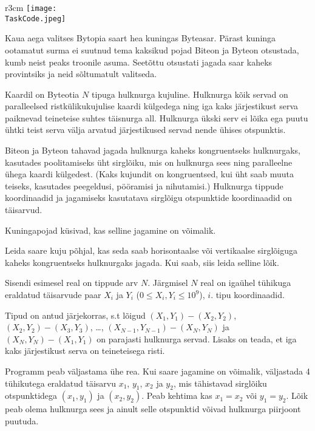 ﻿\documentclass{boi2014-et}
\renewcommand{\TaskCode}{demarcation}
\begin{document}
    \begin{wrapfigure}{r}{3cm}
        \vspace{-24pt}
        \texttt{[image: \\TaskCode.jpeg]}
    \end{wrapfigure}

    Kaua aega valitses Bytopia saart hea kuningas Byteasar.
    Pärast kuninga ootamatut surma ei suutnud tema kaksikud pojad
    Biteon ja Byteon otsustada, kumb neist peaks troonile asuma.
    Seetõttu otsustati jagada saar kaheks provintsiks ja neid
    sõltumatult valitseda.

    Kaardil on Byteotia $N$ tipuga hulknurga kujuline.
    Hulknurga kõik servad on paralleelsed ristkülikukujulise kaardi külgedega ning
    iga kaks järjestikust serva paiknevad teineteise suhtes täisnurga all.
    Hulknurga ükski serv ei lõika ega puutu ühtki teist serva välja arvatud
    järjestikused servad nende ühises otspunktis.

    Biteon ja Byteon tahavad jagada hulknurga kaheks kongruentseks hulknurgaks,
    kasutades poolitamiseks üht sirglõiku,
    mis on hulknurga sees ning paralleelne ühega kaardi külgedest.
    (Kaks kujundit on kongruentsed, kui üht saab muuta teiseks,
    kasutades peegeldusi, pööramisi ja nihutamisi.)
    Hulknurga tippude koordinaadid ja jagamiseks
    kasutatava sirglõigu otspunktide koordinaadid on täisarvud.

    Kuningapojad küsivad, kas selline jagamine on võimalik.

    \Task

    Leida saare kuju põhjal, kas seda saab horisontaalse või vertikaalse sirglõiguga
    kaheks kongruentseks hulknurgaks jagada.
    Kui saab, siis leida selline lõik.

    \Input

    Sisendi esimesel real on tippude arv $N$.
    Järgmisel $N$ real on igaühel tühikuga eraldatud täisarvude paar
    $X_i$ ja $Y_i$ ($0 \le X_i, Y_i \le 10^9$), $i$. tipu koordinaadid.

    Tipud on antud järjekorras, s.t lõigud $(X_1,Y_1) - (X_2,Y_2)$,
    $(X_2,Y_2) - (X_3,Y_3)$, \ldots, $(X_{N-1},Y_{N-1}) - (X_N,Y_N)$ ja
    $(X_N,Y_N) - (X_1,Y_1)$ on parajasti hulknurga servad.
    Lisaks on teada, et iga kaks järjestikust serva on teineteisega risti.

    \Output

    Programm peab väljastama ühe rea.
    Kui saare jagamine on võimalik, väljastada 4 tühikutega eraldatud täisarvu
    $x_1$, $y_1$, $x_2$ ja $y_2$, mis tähistavad sirglõiku otspunktidega
    $(x_1, y_1)$ ja $(x_2, y_2)$.
    Peab kehtima kas $x_1 = x_2$ või $y_1 = y_2$.
    Lõik peab olema hulknurga sees ja ainult selle otspunktid võivad
    hulknurga piirjoont puutuda.
\end{document}
